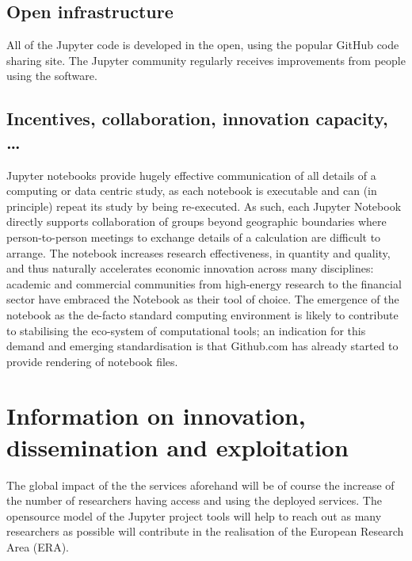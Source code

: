 
\subsection{Open infrastructure}

All of the Jupyter code is developed in the open, using the popular GitHub
code sharing site. The Jupyter community regularly receives improvements from
people using the software.

\subsection{Incentives, collaboration, innovation capacity, \ldots}
Jupyter notebooks provide hugely effective communication of all
details of a computing or data centric study, as each notebook is
executable and can (in principle) repeat its study by being
re-executed. As such, each Jupyter Notebook directly supports
collaboration of groups beyond geographic boundaries where
person-to-person meetings to exchange details of a calculation are
difficult to arrange. The notebook increases research effectiveness,
in quantity and quality, and thus naturally accelerates economic
innovation across many disciplines: academic and commercial
communities from high-energy research to the financial sector have
embraced the Notebook as their tool of choice. The emergence of the
notebook as the de-facto standard computing environment is likely to
contribute to stabilising the eco-system of computational tools; an
indication for this demand and emerging standardisation is that
Github.com has already started to provide rendering of notebook files.




\section{Information on innovation, dissemination and exploitation}

The global impact of the the services aforehand will be of course the increase of the number of researchers having access and using the deployed services. The opensource model of the Jupyter project tools will help to reach out as many researchers as possible will contribute in the realisation of the European Research Area  (ERA).

